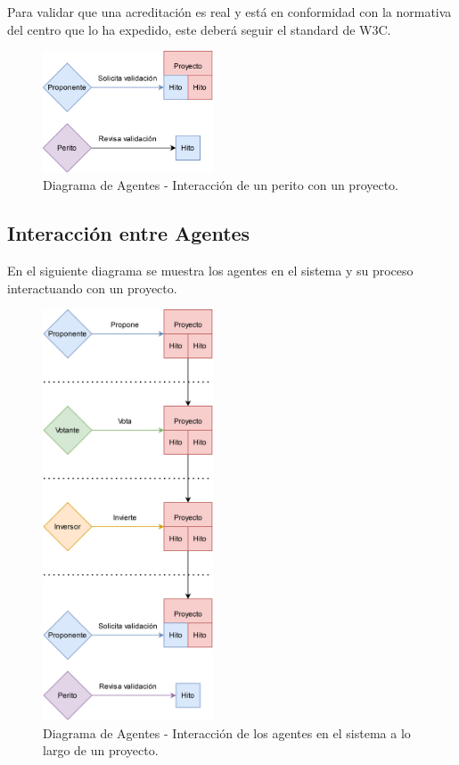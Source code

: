 \bigskip

Para validar que una acreditación es real y está en conformidad con la normativa del centro que lo ha expedido, este deberá seguir el standard \cite{w3c} de W3C.

\begin{figure}[H]
        \centering
        \includegraphics[width=0.45\textwidth]{img/diagramas/perito.png}
        \caption{Diagrama de Agentes - Interacción de un perito con un proyecto.}
        \label{fig:configApi}
\end{figure}

\newpage

\subsection{Interacción entre Agentes}

En el siguiente diagrama se muestra los agentes en el sistema y su proceso interactuando con un proyecto.

\begin{figure}[H]
        \centering
        \includegraphics[width=0.45\textwidth]{img/diagramas/agentes.png}
        \caption{Diagrama de Agentes - Interacción de los agentes en el sistema a lo largo de un proyecto.}
        \label{fig:configApi}
\end{figure}


